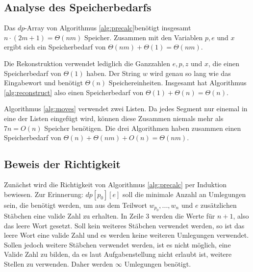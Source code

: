 \documentclass[a4paper,10pt,ngerman]{scrartcl}
\begin{document}
\subsection{Analyse des Speicherbedarfs}
Das $dp$-Array von Algorithmus \ref{alg:precalc}benötigt insgesamt $n \cdot (2m + 1) = \Theta(nm)$ Speicher. Zusammen mit den Variablen $p, e$ und $x$ ergibt sich ein Speicherbedarf von $\Theta(nm) + \Theta(1) = \Theta(nm)$.

Die Rekonstruktion verwendet lediglich die Ganzzahlen $e, p, z$ und $x$, die einen Speicherbedarf von $\Theta(1)$ haben. Der String $w$ wird genau so lang wie das Eingabewort und benötigt $\Theta(n)$ Speichereinheiten. 
Insgesamt hat Algorithmus \ref{alg:reconstruct} also einen Speicherbedarf von $\Theta(1) + \Theta(n) = \Theta(n)$.

Algorithmus \ref{alg:moves} verwendet zwei Listen. Da jedes Segment nur einemal in eine der Listen eingefügt wird, können diese Zusammen niemals mehr als $7n = O(n)$ Speicher benötigen. 
Die drei Algorithmen haben zusammen einen Speicherbedarf von $\Theta(n) + \Theta(nm) + O(n)= \Theta(nm)$.
\subsection{Beweis der Richtigkeit}
Zunächst wird die Richtigkeit von Algorithmus \ref*{alg:precalc} per Induktion bewiesen.
Zur Erinnerung: $dp[p_0][e]$ soll die minimale Anzahl an Umlegungen sein, die benötigt werden, um aus dem Teilwort $w_{p_0}, ..., w_n$ und $e$ zusätzlichen Stäbchen eine valide Zahl zu erhalten.  
In Zeile 3 werden die Werte für $n+1$, also das leere Wort gesetzt. Soll kein weiteres Stäbchen verwendet werden, so ist das leere Wort eine valide Zahl und es werden keine weiteren Umlegungen verwendet. 
Sollen jedoch weitere Stäbchen verwendet werden, ist es nicht möglich, eine Valide Zahl zu bilden, da es laut Aufgabenstellung nicht erlaubt ist, weitere Stellen zu verwenden. Daher werden $\infty$ Umlegungen benötigt. 
\end{document}
